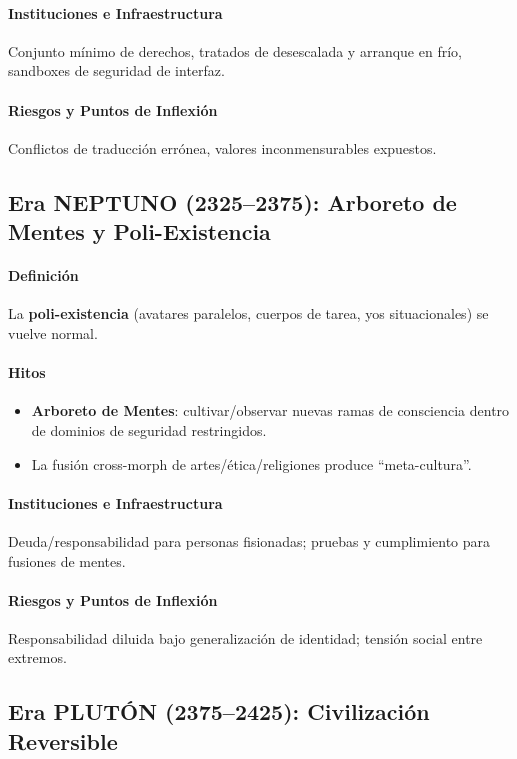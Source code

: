 \documentclass[11pt]{article}
\begin{document}
\paragraph{Instituciones e Infraestructura} Conjunto mínimo de derechos, tratados de desescalada y arranque en frío, sandboxes de seguridad de interfaz.

\paragraph{Riesgos y Puntos de Inflexión} Conflictos de traducción errónea, valores inconmensurables expuestos.

\subsection{Era NEPTUNO (2325–2375): Arboreto de Mentes y Poli-Existencia}
\paragraph{Definición} La \textbf{poli-existencia} (avatares paralelos, cuerpos de tarea, yos situacionales) se vuelve normal.

\paragraph{Hitos}
\begin{itemize}[noitemsep]
  \item \textbf{Arboreto de Mentes}: cultivar/observar nuevas ramas de consciencia dentro de dominios de seguridad restringidos.
  \item La fusión cross-morph de artes/ética/religiones produce ``meta-cultura''.
\end{itemize}

\paragraph{Instituciones e Infraestructura} Deuda/responsabilidad para personas fisionadas; pruebas y cumplimiento para fusiones de mentes.

\paragraph{Riesgos y Puntos de Inflexión} Responsabilidad diluida bajo generalización de identidad; tensión social entre extremos.

\subsection{Era PLUTÓN (2375–2425): Civilización Reversible}
\end{document}
